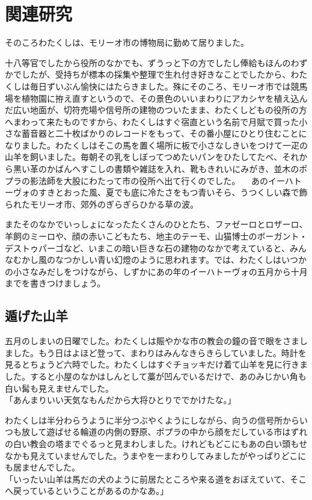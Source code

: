 \section{関連研究}
そのころわたくしは、モリーオ市の博物局に勤めて居りました。

十八等官でしたから役所のなかでも、ずうっと下の方でしたし俸給もほんのわずかでしたが、受持ちが標本の採集や整理で生れ付き好きなことでしたから、わたくしは毎日ずいぶん愉快にはたらきました。殊にそのころ、モリーオ市では競馬場を植物園に拵え直すというので、その景色のいいまわりにアカシヤを植え込んだ広い地面が、切符売場や信号所の建物のついたまま、わたくしどもの役所の方へまわって来たものですから、わたくしはすぐ宿直という名前で月賦で買った小さな蓄音器と二十枚ばかりのレコードをもって、その番小屋にひとり住むことになりました。わたくしはそこの馬を置く場所に板で小さなしきいをつけて一疋の山羊を飼いました。毎朝その乳をしぼってつめたいパンをひたしてたべ、それから黒い革のかばんへすこしの書類や雑誌を入れ、靴もきれいにみがき、並木のポプラの影法師を大股にわたって市の役所へ出て行くのでした。
　あのイーハトーヴォのすきとおった風、夏でも底に冷たさをもつ青いそら、うつくしい森で飾られたモリーオ市、郊外のぎらぎらひかる草の波。

またそのなかでいっしょになったたくさんのひとたち、ファゼーロとロザーロ、羊飼のミーロや、顔の赤いこどもたち、地主のテーモ、山猫博士のボーガント・デストゥパーゴなど、いまこの暗い巨きな石の建物のなかで考えていると、みんなむかし風のなつかしい青い幻燈のように思われます。では、わたくしはいつかの小さなみだしをつけながら、しずかにあの年のイーハトーヴォの五月から十月までを書きつけましょう。

\subsection{遁げた山羊}
五月のしまいの日曜でした。わたくしは賑やかな市の教会の鐘の音で眼をさましました。もう日はよほど登って、まわりはみんなきらきらしていました。時計を見るとちょうど六時でした。わたくしはすぐチョッキだけ着て山羊を見に行きました。すると小屋のなかはしんとして藁が凹んでいるだけで、あのみじかい角も白い髯も見えませんでした。\\
「あんまりいい天気なもんだから大将ひとりででかけたな。」

わたくしは半分わらうように半分つぶやくようにしながら、向うの信号所からいつも放して遊ばせる輪道の内側の野原、ポプラの中から顔をだしている市はずれの白い教会の塔までぐるっと見まわしました。けれどもどこにもあの白い頭もせなかも見えていませんでした。うまやを一まわりしてみましたがやっぱりどこにも居ませんでした。\\
「いったい山羊は馬だの犬のように前居たところや来る道をおぼえていて、そこへ戻っているということがあるのかなあ。」

